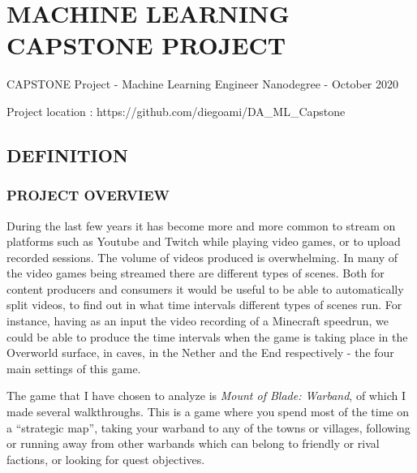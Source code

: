 \documentclass[
]{article}
\author{}
\date{}
\begin{document}
\hypertarget{machine-learning-capstone-project}{%
\section{MACHINE LEARNING CAPSTONE
PROJECT}\label{machine-learning-capstone-project}}

CAPSTONE Project - Machine Learning Engineer Nanodegree - October 2020

Project location : https://github.com/diegoami/DA\_ML\_Capstone

\hypertarget{definition}{%
\subsection{DEFINITION}\label{definition}}

\hypertarget{project-overview}{%
\subsubsection{PROJECT OVERVIEW}\label{project-overview}}

During the last few years it has become more and more common to stream
on platforms such as Youtube and Twitch while playing video games, or to
upload recorded sessions. The volume of videos produced is overwhelming.
In many of the video games being streamed there are different types of
scenes. Both for content producers and consumers it would be useful to
be able to automatically split videos, to find out in what time
intervals different types of scenes run. For instance, having as an
input the video recording of a Minecraft speedrun, we could be able to
produce the time intervals when the game is taking place in the
Overworld surface, in caves, in the Nether and the End respectively -
the four main settings of this game.

The game that I have chosen to analyze is \emph{Mount of Blade:
Warband}, of which I made several walkthroughs. This is a game where you
spend most of the time on a ``strategic map'', taking your warband to
any of the towns or villages, following or running away from other
warbands which can belong to friendly or rival factions, or looking for
quest objectives.
\end{document}
